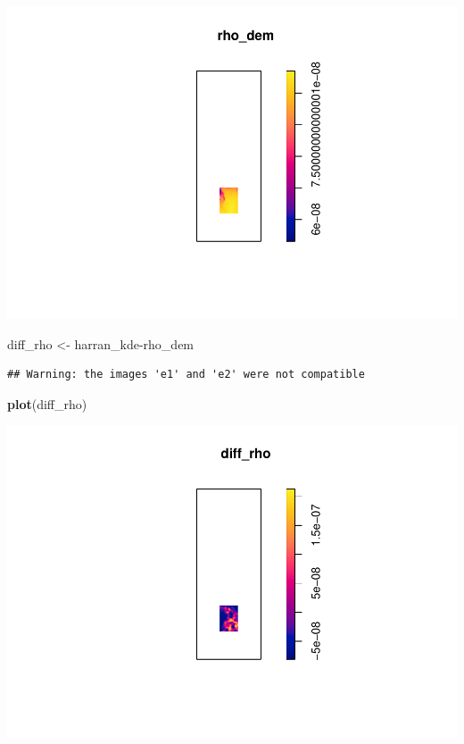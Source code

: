 \documentclass[]{article}
\newenvironment{Shaded}{\begin{snugshade}}{\end{snugshade}}
\newcommand{\KeywordTok}[1]{\textcolor[rgb]{0.13,0.29,0.53}{\textbf{{#1}}}}
\newcommand{\StringTok}[1]{\textcolor[rgb]{0.31,0.60,0.02}{{#1}}}
\newcommand{\NormalTok}[1]{{#1}}
\begin{document}
\includegraphics{HarranPlain_files/figure-latex/unnamed-chunk-7-2.pdf}

\begin{Shaded}
\begin{Highlighting}[]
\NormalTok{diff_rho <-}\StringTok{ }\NormalTok{harran_kde-rho_dem}
\end{Highlighting}
\end{Shaded}

\begin{verbatim}
## Warning: the images 'e1' and 'e2' were not compatible
\end{verbatim}

\begin{Shaded}
\begin{Highlighting}[]
\KeywordTok{plot}\NormalTok{(diff_rho)}
\end{Highlighting}
\end{Shaded}

\includegraphics{HarranPlain_files/figure-latex/unnamed-chunk-7-3.pdf}
\end{document}
